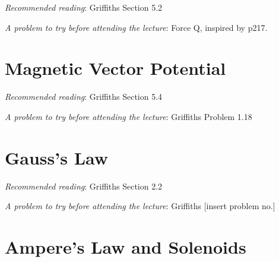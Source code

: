 \documentclass[
  letterpaper,
  DIV=11,
  numbers=noendperiod]{scrreprt}
\begin{document}
\emph{Recommended reading}: Griffiths Section 5.2

\emph{A problem to try before attending the lecture}: Force Q, inspired
by p217.


\chapter{Magnetic Vector Potential}\label{magnetic-vector-potential}

\newcommand{\l}{\mathrm{\mathbf{l}}}
\newcommand{\E}{\mathrm{\mathbf{E}}}
\newcommand{\F}{\mathrm{\mathbf{F}}}
\newcommand{\r}{\mathrm{\mathbf{r}}}

\newcommand{\x}{\mathrm{\mathbf{x}}}
\newcommand{\y}{\mathrm{\mathbf{y}}}
\newcommand{\z}{\mathrm{\mathbf{z}}}

\emph{Recommended reading}: Griffiths Section 5.4

\emph{A problem to try before attending the lecture}: Griffiths Problem
1.18


\chapter{Gauss's Law}\label{gausss-law}

\newcommand{\l}{\mathrm{\mathbf{l}}}
\newcommand{\E}{\mathrm{\mathbf{E}}}
\newcommand{\F}{\mathrm{\mathbf{F}}}
\newcommand{\r}{\mathrm{\mathbf{r}}}

\newcommand{\x}{\mathrm{\mathbf{x}}}
\newcommand{\y}{\mathrm{\mathbf{y}}}
\newcommand{\z}{\mathrm{\mathbf{z}}}

\emph{Recommended reading}: Griffiths Section 2.2

\emph{A problem to try before attending the lecture}: Griffiths
{[}insert problem no.{]}


\chapter{Ampere's Law and Solenoids}\label{amperes-law-and-solenoids}

\newcommand{\l}{\mathrm{\mathbf{l}}}
\newcommand{\E}{\mathrm{\mathbf{E}}}
\newcommand{\F}{\mathrm{\mathbf{F}}}
\newcommand{\r}{\mathrm{\mathbf{r}}}

\newcommand{\x}{\mathrm{\mathbf{x}}}
\newcommand{\y}{\mathrm{\mathbf{y}}}
\newcommand{\z}{\mathrm{\mathbf{z}}}
\end{document}

